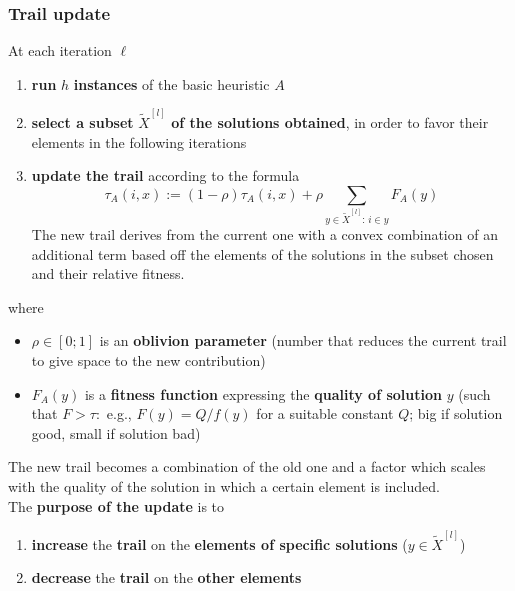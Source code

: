 \subsubsection{Trail update}
At each iteration $\ell$
\begin{enumerate}
	\item \textbf{run} $h$ \textbf{instances} of the basic heuristic $A$
	
	\item \textbf{select a subset} $\tilde{X}^{[l]}$ \textbf{of the solutions obtained}, in order to favor their elements in the following iterations
	
	\item \textbf{update the trail} according to the formula
	$$ \tau_A (i,x) := (1 - \rho) \tau_A (i,x) + \rho \sum_{y \in \tilde{X}^{[l]}: \, i \in y} F_A (y) $$
	The new trail derives from the current one with a convex combination of an additional term based off the elements of the solutions in the subset chosen and their relative fitness.
\end{enumerate}

where
\begin{itemize}
	\item $\rho \in [0; 1]$ is an \textbf{oblivion parameter} (number that reduces the current trail to give space to the new contribution)
	
	\item $F_A (y)$ is a \textbf{fitness function} expressing the \textbf{quality of solution} $y$ (such that $F > \tau :$ e.g., $F (y ) = Q/f (y )$ for a suitable constant $Q$; big if solution good, small if solution bad)
\end{itemize}

The new trail becomes a combination of the old one and a factor which scales with the quality of the solution in which a certain element is included.\\

The \textbf{purpose of the update} is to
\begin{enumerate}
	\item \textbf{increase} the \textbf{trail} on the \textbf{elements of specific solutions} ($y ∈ \tilde{X}^{[l]}$)
	
	\item \textbf{decrease} the \textbf{trail} on the \textbf{other elements}
\end{enumerate}

\newpage

